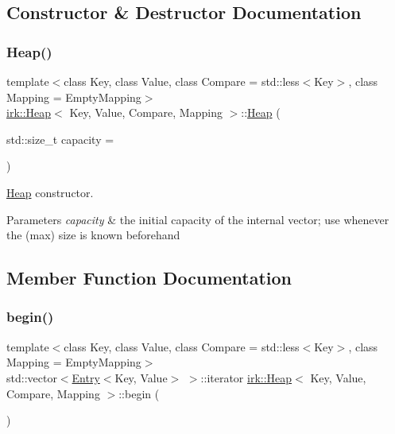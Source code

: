 \subsection{Constructor \& Destructor Documentation}
\mbox{\label{classirk_1_1Heap_a9e92f4197b0da14b752fef07cce1efab}} 
\subsubsection{\texorpdfstring{Heap()}{Heap()}}
{\footnotesize\ttfamily template$<$class Key, class Value, class Compare = std\+::less$<$\+Key$>$, class Mapping = Empty\+Mapping$>$ \\
\mbox{\hyperlink{classirk_1_1Heap}{irk\+::\+Heap}}$<$ Key, Value, Compare, Mapping $>$\+::\mbox{\hyperlink{classirk_1_1Heap}{Heap}} (\begin{DoxyParamCaption}\item[{std\+::size\+\_\+t}]{capacity = {} }\end{DoxyParamCaption})\hspace{0.3cm}{\ttfamily [inline]}}

\mbox{\hyperlink{classirk_1_1Heap}{Heap}} constructor.


\begin{DoxyParams}{Parameters}
{\em capacity} & the initial capacity of the internal vector; use whenever the (max) size is known beforehand \\
\hline
\end{DoxyParams}


\subsection{Member Function Documentation}
\mbox{\label{classirk_1_1Heap_a10a78919e46bc987f874bb8558e23e25}} 
\subsubsection{\texorpdfstring{begin()}{begin()}}
{\footnotesize\ttfamily template$<$class Key, class Value, class Compare = std\+::less$<$\+Key$>$, class Mapping = Empty\+Mapping$>$ \\
std\+::vector$<$\mbox{\hyperlink{structirk_1_1Entry}{Entry}}$<$Key, Value$>$ $>$\+::iterator \mbox{\hyperlink{classirk_1_1Heap}{irk\+::\+Heap}}$<$ Key, Value, Compare, Mapping $>$\+::begin (\begin{DoxyParamCaption}{ }\end{DoxyParamCaption})\hspace{0.3cm}{\ttfamily [inline]}}

